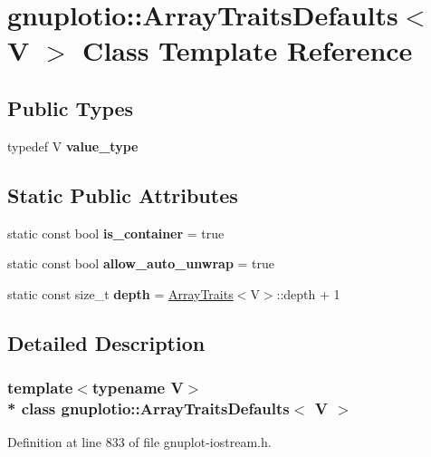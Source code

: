 \hypertarget{classgnuplotio_1_1_array_traits_defaults}{}\section{gnuplotio\+:\+:Array\+Traits\+Defaults$<$ V $>$ Class Template Reference}
\label{classgnuplotio_1_1_array_traits_defaults}
\subsection*{Public Types}
\begin{DoxyCompactItemize}
\item 
typedef V {\bfseries value\+\_\+type}\hypertarget{classgnuplotio_1_1_array_traits_defaults_ad7a9e8d19419fabe2ab9cc1b76c9965b}{}\label{classgnuplotio_1_1_array_traits_defaults_ad7a9e8d19419fabe2ab9cc1b76c9965b}

\end{DoxyCompactItemize}
\subsection*{Static Public Attributes}
\begin{DoxyCompactItemize}
\item 
static const bool {\bfseries is\+\_\+container} = true\hypertarget{classgnuplotio_1_1_array_traits_defaults_a57bab5bf3617f0ee66fdd4dcb751aa21}{}\label{classgnuplotio_1_1_array_traits_defaults_a57bab5bf3617f0ee66fdd4dcb751aa21}

\item 
static const bool {\bfseries allow\+\_\+auto\+\_\+unwrap} = true\hypertarget{classgnuplotio_1_1_array_traits_defaults_ac8d430cba6ceefc6f52706455f12a0e8}{}\label{classgnuplotio_1_1_array_traits_defaults_ac8d430cba6ceefc6f52706455f12a0e8}

\item 
static const size\+\_\+t {\bfseries depth} = \hyperlink{classgnuplotio_1_1_array_traits}{Array\+Traits}$<$V$>$\+::depth + 1\hypertarget{classgnuplotio_1_1_array_traits_defaults_ac51367f5da9096249b162af1496e36ab}{}\label{classgnuplotio_1_1_array_traits_defaults_ac51367f5da9096249b162af1496e36ab}

\end{DoxyCompactItemize}


\subsection{Detailed Description}
\subsubsection*{template$<$typename V$>$\\*
class gnuplotio\+::\+Array\+Traits\+Defaults$<$ V $>$}



Definition at line 833 of file gnuplot-\/iostream.\+h.

